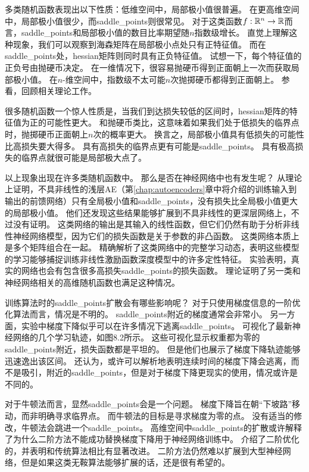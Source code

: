 多类随机函数表现出以下性质：低维空间中，局部极小值很普遍。
在更高维空间中，局部极小值很少，而\gls{saddle_points}则很常见。
对于这类函数$f:\mathbb{R}^n \to \mathbb{R}$而言，\gls{saddle_points}和局部极小值的数目比率期望随$n$指数级增长。
直觉上理解这种现象，我们可以观察到海森矩阵在局部极小点处只有正特征值。
而在\gls{saddle_points}处，\gls{hessian}矩阵则同时具有正负特征值。
试想一下，每个特征值的正负号由抛硬币决定。
在一维情况下，很容易抛硬币得到正面朝上一次而获取局部极小值。
在$n$-维空间中，指数级不太可能$n$次抛掷硬币都得到正面朝上。
参看\cite{Dauphin-et-al-NIPS2014-small}，回顾相关理论工作。


很多随机函数一个惊人性质是，当我们到达损失较低的区间时，\gls{hessian}矩阵的特征值为正的可能性更大。
和抛硬币类比，这意味着如果我们处于低损失的临界点时，抛掷硬币正面朝上$n$次的概率更大。
换言之，局部极小值具有低损失的可能性比高损失要大得多。
具有高损失的临界点更有可能是\gls{saddle_points}。
具有极高损失的临界点就很可能是局部极大点了。

以上现象出现在许多类随机函数中。
那么是否在神经网络中也有发生呢？
\cite{Baldi89}从理论上证明，不具非线性的浅层\gls{AE}（第\ref{chap:autoencoders}章中将介绍的训练输入到输出的前馈网络）只有全局极小值和\gls{saddle_points}，没有损失比全局极小值更大的局部极小值。
他们还发现这些结果能够扩展到不具非线性的更深层网络上，不过没有证明。
这类网络的输出是其输入的线性函数，但它们仍然有助于分析非线性神经网络模型，因为它们的损失函数是关于参数的非凸函数。
这类网络本质上是多个矩阵组合在一起。
\cite{Saxe-et-al-ICLR13}精确解析了这类网络中的完整学习动态，表明这些模型的学习能够捕捉训练非线性激励函数深度模型中的许多定性特征。
\cite{Dauphin-et-al-NIPS2014-small}实验表明，真实的网络也会有包含很多高损失\gls{saddle_points}的损失函数。
\cite{Choromanska-et-al-AISTATS2015}理论证明了另一类和神经网络相关的高维随机函数也满足这种情况。

训练算法时的\gls{saddle_points}扩散会有哪些影响呢？
对于只使用梯度信息的一阶优化算法而言，情况是不明的。
\gls{saddle_points}附近的梯度通常会非常小。
另一方面，实验中梯度下降似乎可以在许多情况下逃离\gls{saddle_points}。
\cite{GoodfellowOptimization15}可视化了最新神经网络的几个学习轨迹，如图8.2所示。
这些可视化显示权重都为零的\gls{saddle_points}附近，损失函数都是平坦的。
但是他们也展示了梯度下降轨迹能够迅速逸出该区间。
\cite{GoodfellowOptimization15}还认为，或许可以解析地表明连续时间的梯度下降会逃离，而不是吸引，附近的\gls{saddle_points}，但是对于梯度下降更现实的使用，情况或许是不同的。

对于牛顿法而言，显然\gls{saddle_points}会是一个问题。
梯度下降旨在朝“下坡路”移动，而非明确寻求临界点。
而牛顿法的目标是寻求梯度为零的点。
没有适当的修改，牛顿法会跳进一个\gls{saddle_points}。
高维空间中\gls{saddle_points}的扩散或许解释了为什么二阶方法不能成功替换梯度下降用于神经网络训练中。
\cite{Dauphin-et-al-NIPS2014-small}介绍了二阶优化的，并表明和传统算法相比有显著改进。
二阶方法仍然难以扩展到大型神经网络，但是如果这类无鞍算法能够扩展的话，还是很有希望的。

